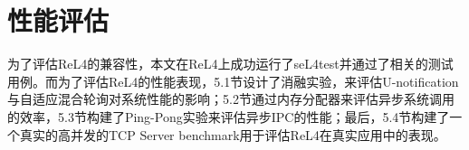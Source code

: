 \chapter{性能评估}
为了评估ReL4的兼容性，本文在ReL4上成功运行了seL4test并通过了相关的测试用例。而为了评估ReL4的性能表现，5.1节设计了消融实验，来评估U-notification与自适应混合轮询对系统性能的影响；5.2节通过内存分配器来评估异步系统调用的效率，5.3节构建了Ping-Pong实验来评估异步IPC的性能；最后，5.4节构建了一个真实的高并发的TCP Server benchmark用于评估ReL4在真实应用中的表现。
